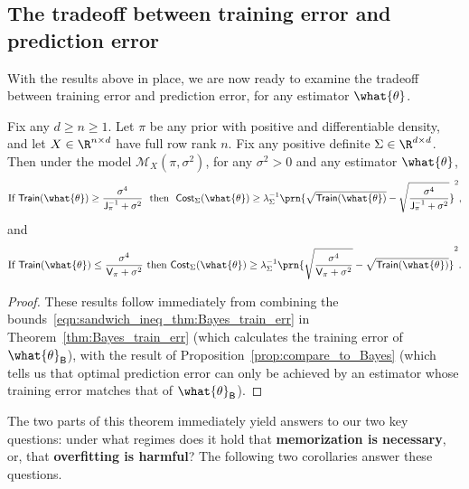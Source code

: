 \documentclass[11pt]{article}
\newcommand{\bysest}{\what{\theta}_{\mathsf{B}}}
\newcommand{\trerr}{\mathsf{Train}}
\newcommand{\cost}{\mathsf{Cost}}
\newcommand{\model}{\mathscr{M}}
\newcommand{\jfunc}{\mathsf{J}}
\begin{document}
\subsection{The tradeoff between training error and prediction error}\label{sec:main_results_tradeoff}
With the results above in place, we are now ready to examine the tradeoff between training error and prediction error, for any estimator $\what{\theta}$.
\begin{theorem}\label{thm:main}
    Fix any $d\geq n\geq 1$. Let $\pi$ be any prior with positive and differentiable density, and let $X\in\R^{n\times d}$ have full row rank $n$. Fix any positive definite $\Sigma\in\R^{d\times d}$. Then under the model $\model_X(\pi,\sigma^2)$, for any $\sigma^2>0$ and any estimator $\what{\theta}$, 
    \begin{equation}\label{eqn:trerr_too_high__thm:main}\textnormal{If $\trerr(\what{\theta})\geq \frac{\sigma^4}{\jfunc_\pi^{-1}+\sigma^2}$ \ then \ }\cost_\Sigma(\what{\theta})\geq \lambda_\Sigma^{-1}\prn{\sqrt{\trerr(\what{\theta})}-\sqrt{\frac{\sigma^4}{\jfunc_\pi^{-1}+\sigma^2}}}^2,\end{equation}
    and
    \begin{equation}\label{eqn:trerr_too_low__thm:main}\textnormal{If $\trerr(\what{\theta})\leq \frac{\sigma^4}{\mathsf{V}_\pi+\sigma^2}$ then }\cost_\Sigma(\what{\theta})\geq \lambda_\Sigma^{-1}\prn{\sqrt{\frac{\sigma^4}{\mathsf{V}_\pi+\sigma^2}} - \sqrt{\trerr(\what{\theta})}}^2.\end{equation}
\end{theorem}
\begin{proof}
    These results follow immediately from combining the bounds~\eqref{eqn:sandwich_ineq_thm:Bayes_train_err} in Theorem~\ref{thm:Bayes_train_err} (which calculates the training error of $\bysest$), with the result of Proposition~\ref{prop:compare_to_Bayes} (which tells us that optimal prediction error can only be achieved by an estimator whose training error matches that of $\bysest$).
\end{proof}

The two parts of this theorem immediately yield answers to our two key questions: under what regimes does it hold that \textbf{memorization is necessary}, or, that \textbf{overfitting is harmful}? The following two corollaries answer these questions.
\end{document}
